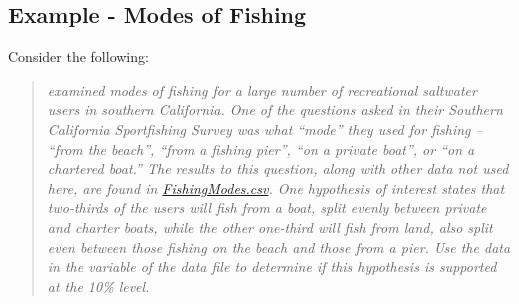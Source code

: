 \documentclass[10pt,openany]{book}\usepackage[]{graphicx}\usepackage[]{color}
\begin{document}
\subsection{Example - Modes of Fishing}
\vspace{-12pt}
Consider the following:
\begin{quote}
\textsl{\cite{HerrigesKing1999} examined modes of fishing for a large number of recreational saltwater users in southern California.  One of the questions asked in their Southern California Sportfishing Survey was what ``mode'' they used for fishing -- ``from the beach'', ``from a fishing pier'', ``on a private boat'', or ``on a chartered boat.''  The results to this question, along with other data not used here, are found in \href{https://raw.githubusercontent.com/droglenc/NCData/master/FishingModes.csv}{FishingModes.csv}.  One hypothesis of interest states that two-thirds of the users will fish from a boat, split evenly between private and charter boats, while the other one-third will fish from land, also split even between those fishing on the beach and those from a pier.  Use the data in the  variable of the data file to determine if this hypothesis is supported at the 10\% level.}
\end{quote}
\end{document}
